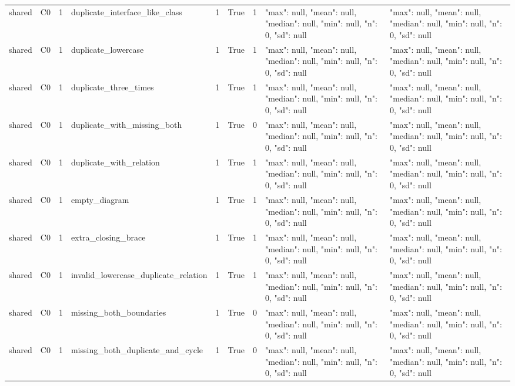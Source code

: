 \begin{tabular}{lllllllll}
shared & C0 & 1 & duplicate\_interface\_like\_class & 1 & True & 1 & {"max": null, "mean": null, "median": null, "min": null, "n": 0, "sd": null} & {"max": null, "mean": null, "median": null, "min": null, "n": 0, "sd": null} \\
shared & C0 & 1 & duplicate\_lowercase & 1 & True & 1 & {"max": null, "mean": null, "median": null, "min": null, "n": 0, "sd": null} & {"max": null, "mean": null, "median": null, "min": null, "n": 0, "sd": null} \\
shared & C0 & 1 & duplicate\_three\_times & 1 & True & 1 & {"max": null, "mean": null, "median": null, "min": null, "n": 0, "sd": null} & {"max": null, "mean": null, "median": null, "min": null, "n": 0, "sd": null} \\
shared & C0 & 1 & duplicate\_with\_missing\_both & 1 & True & 0 & {"max": null, "mean": null, "median": null, "min": null, "n": 0, "sd": null} & {"max": null, "mean": null, "median": null, "min": null, "n": 0, "sd": null} \\
shared & C0 & 1 & duplicate\_with\_relation & 1 & True & 1 & {"max": null, "mean": null, "median": null, "min": null, "n": 0, "sd": null} & {"max": null, "mean": null, "median": null, "min": null, "n": 0, "sd": null} \\
shared & C0 & 1 & empty\_diagram & 1 & True & 1 & {"max": null, "mean": null, "median": null, "min": null, "n": 0, "sd": null} & {"max": null, "mean": null, "median": null, "min": null, "n": 0, "sd": null} \\
shared & C0 & 1 & extra\_closing\_brace & 1 & True & 1 & {"max": null, "mean": null, "median": null, "min": null, "n": 0, "sd": null} & {"max": null, "mean": null, "median": null, "min": null, "n": 0, "sd": null} \\
shared & C0 & 1 & invalid\_lowercase\_duplicate\_relation & 1 & True & 1 & {"max": null, "mean": null, "median": null, "min": null, "n": 0, "sd": null} & {"max": null, "mean": null, "median": null, "min": null, "n": 0, "sd": null} \\
shared & C0 & 1 & missing\_both\_boundaries & 1 & True & 0 & {"max": null, "mean": null, "median": null, "min": null, "n": 0, "sd": null} & {"max": null, "mean": null, "median": null, "min": null, "n": 0, "sd": null} \\
shared & C0 & 1 & missing\_both\_duplicate\_and\_cycle & 1 & True & 0 & {"max": null, "mean": null, "median": null, "min": null, "n": 0, "sd": null} & {"max": null, "mean": null, "median": null, "min": null, "n": 0, "sd": null} \\

\end{tabular}
